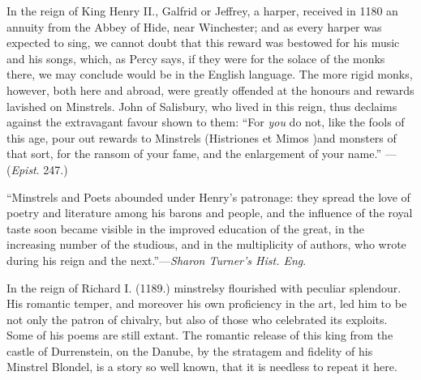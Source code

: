 In the reign of King Henry II., Galfrid or Jeffrey, a harper, received in 1180
an annuity from the Abbey of Hide, near Winchester; and as every harper was
expected to sing, %
we cannot doubt that this reward was bestowed for his music
and his songs, which, as Percy says, if they were for the solace of the monks there,
we may conclude would be in the English language. The more rigid monks,
however, both here and abroad, were greatly offended at the honours and rewards
lavished on Minstrels. John of Salisbury, who lived in this reign, thus declaims
against the extravagant favour shown to them: “For \textit{you} do not, like the fools of
this age, pour out rewards to Minstrels (Histriones et Mimos %
)and monsters of
that sort, for the ransom of your fame, and the enlargement of your name.”
—(\textit{Epist}. 247.)

“Minstrels and Poets abounded under Henry’s patronage: they spread the love
of poetry and literature among his barons and people, and the influence of the
royal taste soon became visible in the improved education of the great, in the
increasing number of the studious, and in the multiplicity of authors, who wrote
during his reign and the next.”—\textit{Sharon Turner’s Hist. Eng}.

In the reign of Richard I. (1189.) minstrelsy flourished with peculiar splendour.
His romantic temper, and moreover his own proficiency in the art, led him to be
not only the patron of chivalry, but also of those who celebrated its exploits.
Some of his poems are still extant. The romantic release of this king from the
castle of Durrenstein, on the Danube, by the stratagem and fidelity of his Minstrel
Blondel, is a story so well known, that it is needless to repeat it here. %



